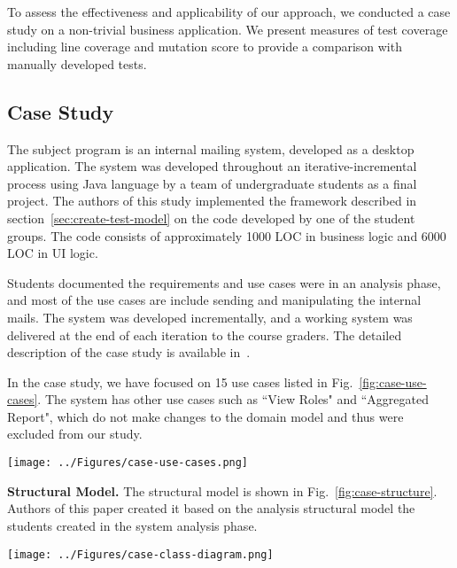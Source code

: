 %
%
\label{sec:evaluation}
To assess the effectiveness and applicability of our approach, we conducted a case study on a non-trivial business application. We present measures of test coverage including line coverage and mutation score to provide a comparison with manually developed tests. 


\subsection{Case Study}
\label{sec:evaluation-case-study}
The subject program is an internal mailing system, developed as a desktop application. The system was developed throughout an iterative-incremental process using Java language by a team of undergraduate students as a final project. The authors of this study implemented the framework described in section~\ref{sec:create-test-model} on the code developed by one of the student groups.
The code consists of approximately 1000 LOC in business logic and 6000 LOC in UI logic.

Students documented the requirements and use cases were in an analysis phase, and most of the use cases are include sending and manipulating the internal mails. The system was developed incrementally, and a working system was delivered at the end of each iteration to the course graders.
The detailed description of the case study is available in~\cite{Jalalinasab2012b}. 

In the case study, we have focused on 15 use cases listed in Fig.~\ref{fig:case-use-cases}. The system has other use cases such as ``View Roles" and ``Aggregated Report", which do not make changes to the domain model and thus were excluded from our study. 

\begin{figure*}[h]
\centering
\texttt{[image: ../Figures/case-use-cases.png]}
\caption{Use case diagram for the case study.}
\label{fig:case-use-cases}
\end{figure*}

\textbf{Structural Model.} The structural model is shown in Fig.~\ref{fig:case-structure}. Authors of this paper created it based on the analysis structural model the students created in the system analysis phase.

\begin{figure*}[!t]
\centering
\texttt{[image: ../Figures/case-class-diagram.png]}%
\caption{Structural model of the case study.}
\label{fig:case-structure}
\end{figure*} 


